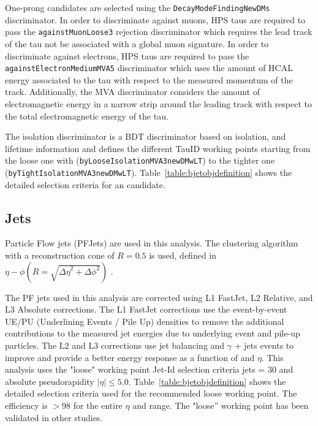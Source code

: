 One-prong \hadtau candidates are selected using the \texttt{Decay\-Mode\-Finding\-New\-DMs} discriminator. In order to discriminate against muons, HPS taus are required to pass the \texttt{against\-Muon\-Loose3} rejection discriminator which requires the lead track of the tau not be associated with a global muon signature. In order to discriminate against electrons, HPS taus are required to pass the \texttt{against\-Electron\-Medium\-MVA5} discriminator which uses the amount of HCAL energy associated to the tau with respect to the measured momentum of the track. Additionally, the MVA discriminator considers the amount of electromagnetic energy in a narrow strip around the leading track with respect to the total electromagnetic energy of the tau. 

The isolation discriminator is a BDT \cite{Hocker:2007ht} discriminator based on isolation, \pt and \hadtau lifetime information and defines the different TauID working points starting from the loose one with (\texttt{byLoose\-Isolation\-MVA3\-newDMwLT}) to the tighter one (\texttt{byTight\-Isolation\-MVA3new\-DMwLT}). Table~\ref{table:bjetobjdefinition} shows the detailed selection criteria for an \hadtau candidate.

\subsection{Jets}
\label{subsec::objsel_jet}


Particle Flow jets (PFJets) are used in this analysis. The \antikt clustering algorithm with a reconstruction cone of \ensuremath{R = 0.5} is used, defined in \ensuremath{\eta-\phi (R = \sqrt{{\Delta \eta}^2 + {\Delta \phi}^{2}})} \cite{1126-6708-2008-04-063}. 

The PF jets used in this analysis are corrected using L1 FastJet, L2 Relative, and L3 Absolute corrections. The L1 FastJet corrections use the event-by-event UE/PU (Underlining Events / Pile Up) densities to remove the additional contributions to the measured jet energies due to underlying event and pile-up particles. The L2 and L3 corrections use jet balancing and \ensuremath{\gamma} + jets events to improve and provide a better energy response as a function of \pt and \ensuremath{\eta}. This analysis uses the "loose" working point Jet-Id selection criteria jets \pt = 30 \gev and absolute pseudorapidity $|\eta| \le 5.0$. Table~\ref{table:bjetobjdefinition} shows the detailed selection criteria used for the recommended loose working point. The efficiency is $> 98$ for the entire $\eta$ and \pt range. The "loose'' working point has been validated in other studies.

